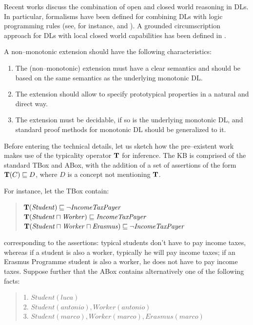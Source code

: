 \documentclass[a4paper, 11pt, oneside]{duthesis}
\newcommand{\tip}{{\bf T}}
\newcommand{\sqset}{\sqsubseteq}
\newcommand{\mint}{\sqcap}
\begin{document}
Recent works discuss the combination of open and closed world reasoning in DLs. In particular, formalisms have been defined for combining DLs with logic programming rules (see, for instance, \cite{eiter2004} and \cite{rosatiacm}). A grounded circumscription approach for DLs with local closed world capabilities has been defined in \cite{hitzlerdl}.

\newpage

A non--monotonic extension should have the following characteristics:

\begin{enumerate}
\item The (non--monotonic) extension must have a clear semantics and should be based on the same semantics as the underlying monotonic DL.
\item The extension should allow to specify prototypical properties in a natural and direct way.
\item The extension must be decidable, if  so is the underlying monotonic DL, and standard proof methods for monotonic DL should be generalized to it.
\end{enumerate}


Before entering the technical details, let us sketch how the pre--existent work makes use of the typicality operator $\tip$ for inference. The KB is comprised of the standard TBox and ABox, with the addition of a set of assertions of the form $\tip(C)\sqsubseteq D$, where $D$ is a concept not mentioning $\tip$.

For instance, let the TBox contain:

\begin{quote}
$\tip (\mathit{Student}) \sqset \mathit{\neg IncomeTaxPayer}$\\
$\tip (\mathit{Student} \mint \mathit{Worker})  \sqset \mathit{IncomeTaxPayer}$\\
$\tip (\mathit{Student} \mint \mathit{Worker} \mint \mathit{Erasmus})  \sqset \mathit{\neg IncomeTaxPayer}$
\end{quote}


\noindent corresponding to the assertions: typical students don't have to pay income taxes, whereas if a student is also a worker, typically he will pay income taxes; if an Erasmus Programme student is also a worker, he does not have to pay income taxes.
Suppose  further that the ABox contains alternatively one of the following facts:

\begin{quote}
1. $\mathit{Student}(\mathit{luca})$ \\
2. $\mathit{Student}(\mathit{antonio}), \mathit{Worker}(\mathit{antonio})$ \\
3. $\mathit{Student}(\mathit{marco}), \mathit{Worker}(\mathit{marco}), Erasmus(\mathit{marco})$
\end{quote}
\end{document}
